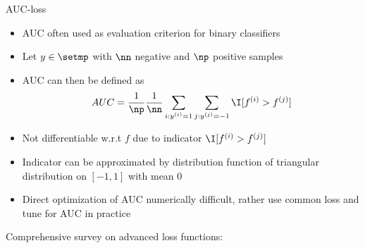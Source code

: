 \documentclass[11pt,compress,t,notes=noshow, xcolor=table]{beamer}
\begin{document}
\begin{frame}{AUC-loss}

\begin{itemize}
\item AUC often used as evaluation criterion for binary classifiers
\item Let $y \in \setmp$ with $\nn$ negative and $\np$ positive samples %
\item AUC can then be defined as
$$AUC = \frac{1}{\np} \frac{1}{\nn} \sum_{i: \yi = 1} \sum_{j: \yi[j] = -1} \I [f^{(i)} > f^{(j)}]$$
\item Not differentiable w.r.t $f$ due to indicator $\I [f^{(i)} > f^{(j)}]$
\item Indicator can be approximated by distribution function of triangular distribution on $[-1, 1]$ with mean $0$
\item Direct optimization of AUC numerically difficult, rather use common loss and tune for AUC in practice

\end{itemize}
\vfill
Comprehensive survey on advanced loss functions: 

\end{frame}

\endlecture
\end{document}
